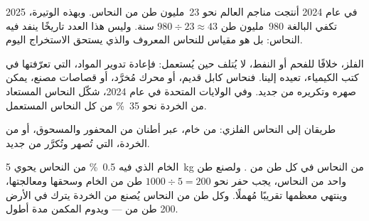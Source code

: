 \begin{dated}{2025}
في عام 2024 أنتجت مناجم العالم نحو 23~مليون طن من النحاس.
وبهذه الوتيرة، تكفي  البالغة 980~مليون طن $980 \div 23
\approx 43$ سنة. وليس هذا العدد تاريخًا ينفد فيه النحاس: بل هو مقياس
للنحاس المعروف والذي يستحق الاستخراج اليوم.
\end{dated}

الفلز، خلافًا للفحم أو النفط، لا يُتلف حين يُستعمل: فإعادة تدوير
المواد، التي تعرّفتها في كتب الكيمياء، تعيده إلينا. فنحاس كابل قديم، أو
محرك مُخرَّد، أو قصاصات مصنع، يمكن صهره وتكريره من جديد. وفي الولايات
المتحدة في عام 2024، شكّل النحاس المستعاد من الخردة نحو \qty{35}{\%}
من كل النحاس
المستعمل.

\begin{omfigure}

{\small طريقان إلى النحاس الفلزي: من خام، عبر أطنان من  المحفور
والمسحوق، أو من الخردة، التي تُصهر وتُكرَّر من جديد.}
\end{omfigure}

\begin{example}\label{ex:g9:earth-resources:recycling}
الخام الذي فيه \qty{0.5}{\%} من النحاس يحوي \qty{5}{kg} من النحاس في كل
طن من . ولصنع طن واحد من النحاس، يجب حفر نحو $1000 \div 5 = 200$
طن من الخام وسحقها ومعالجتها، وينتهي معظمها تقريبًا  مُهملًا. وكل
طن من النحاس يُصنع من الخردة يترك في الأرض 200 طن من  --- ويدوم
المكمن مدة أطول.
\end{example}


